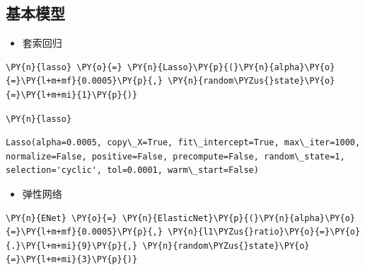 \documentclass[no-math]{YangThesis}
\begin{document}
\hypertarget{ux57faux672cux6a21ux578b}{%
	\subsection{基本模型}\label{ux57faux672cux6a21ux578b}}

\begin{itemize}
	\tightlist
	\item
	套索回归
\end{itemize}

\begin{tcolorbox}[breakable, size=fbox, boxrule=1pt, pad at break*=1mm,colback=cellbackground, colframe=cellborder]
	\begin{Verbatim}[commandchars=\\\{\}]
\PY{n}{lasso} \PY{o}{=} \PY{n}{Lasso}\PY{p}{(}\PY{n}{alpha}\PY{o}{=}\PY{l+m+mf}{0.0005}\PY{p}{,} \PY{n}{random\PYZus{}state}\PY{o}{=}\PY{l+m+mi}{1}\PY{p}{)}
	\end{Verbatim}
\end{tcolorbox}

\begin{tcolorbox}[breakable, size=fbox, boxrule=1pt, pad at break*=1mm,colback=cellbackground, colframe=cellborder]
	\begin{Verbatim}[commandchars=\\\{\}]
\PY{n}{lasso}
	\end{Verbatim}
\end{tcolorbox}

\begin{tcolorbox}[breakable, size=fbox, boxrule=.5pt, pad at break*=1mm, opacityfill=0]
	\begin{Verbatim}[commandchars=\\\{\}]
Lasso(alpha=0.0005, copy\_X=True, fit\_intercept=True, max\_iter=1000,
normalize=False, positive=False, precompute=False, random\_state=1,
selection='cyclic', tol=0.0001, warm\_start=False)
	\end{Verbatim}
\end{tcolorbox}

\begin{itemize}
	\tightlist
	\item
	弹性网络
\end{itemize}

\begin{tcolorbox}[breakable, size=fbox, boxrule=1pt, pad at break*=1mm,colback=cellbackground, colframe=cellborder]
	\begin{Verbatim}[commandchars=\\\{\}]
\PY{n}{ENet} \PY{o}{=} \PY{n}{ElasticNet}\PY{p}{(}\PY{n}{alpha}\PY{o}{=}\PY{l+m+mf}{0.0005}\PY{p}{,} \PY{n}{l1\PYZus{}ratio}\PY{o}{=}\PY{o}{.}\PY{l+m+mi}{9}\PY{p}{,} \PY{n}{random\PYZus{}state}\PY{o}{=}\PY{l+m+mi}{3}\PY{p}{)}
	\end{Verbatim}
\end{tcolorbox}
\end{document}
